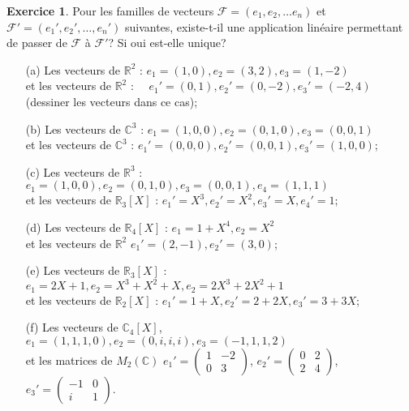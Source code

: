\documentclass[11pt,a4paper]{article}
\theoremstyle{definition}
\newtheorem{exo}{Exercice}
\newcommand{\R}{\mathbb{R}}
\newcommand{\C}{\mathbb{C}}
\begin{document}
\begin{exo}
Pour les familles de vecteurs $\mathcal{F}=(e_1, e_2, \ldots e_n)$ et $\mathcal{F}'=(e_1', e_2', \ldots, e_n')$ suivantes, existe-t-il une application linéaire permettant de passer de $\mathcal{F}$ à $\mathcal{F}'$? Si oui est-elle unique?
\begin{itemize}
\item[(a)] Les vecteurs de $\R^2$ :  $e_1=(1,0), e_2=(3,2), e_3=(1,-2)$  \\
et les vecteurs de $\R^2$ : $\quad e_1'=(0,1), e_2'=(0,-2), e_3'=(-2,4)$ (dessiner les vecteurs dans ce cas);\\
\item[(b)] Les vecteurs de $\C^3$ :   $e_1=(1,0,0), e_2=(0,1,0), e_3=(0,0,1)$ \\ 
et les vecteurs de $\C^3$ : $ e_1'=(0,0,0), e_2'=(0,0,1), e_3'=(1,0,0)$;\\
\item[(c)] Les vecteurs de $\R^3$ :  $e_1=(1,0,0), e_2=(0,1,0), e_3=(0,0,1), e_4=(1,1,1)$  \\ 
 et les vecteurs de $\R_3[X]$ : $e_1'=X^3, e_2'=X^2, e_3'=X, e_4'=1$;\\
\item[(d)] Les vecteurs de $\R_4[X]$ :  $e_1=1+X^4, e_2=X^2$  \\
et les vecteurs de $\R^2$  $e_1'=(2,-1), e_2'=(3,0)$;\\
\item[(e)] Les vecteurs de $\R_3[X]$ : $e_1=2X+1, e_2=X^3+X^2+X, e_2= 2X^3+2X^2+1$  \\et les vecteurs de $\R_2[X]$ : $e_1'=1+X, e_2'=2+2X, e_3'=3+3X$;\\
\item[(f)] Les vecteurs de $\C_4[X]$, $e_1=(1,1,1, 0), e_2=(0,i,i, i), e_3=(-1,1,1,2)$ \\
et les matrices de $M_2(\C)$ $
e_1' = \begin{pmatrix}
1 & -2 \\
0 & 3
\end{pmatrix}
$, 
$e_2' = \begin{pmatrix}
0 & 2 \\
2 & 4
\end{pmatrix}
$,
$e_3' = \begin{pmatrix}
-1 & 0 \\
i & 1
\end{pmatrix}
$.
   \end{itemize}
\end{exo}
\end{document}
